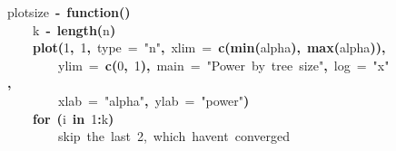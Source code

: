 \documentclass{elsarticle}
\makeatletter
\newcommand{\hlnumber}[1]{\textcolor[rgb]{0,0,0}{#1}}%
\newcommand{\hlfunctioncall}[1]{\textcolor[rgb]{.5,0,.33}{\textbf{#1}}}%
\newcommand{\hlstring}[1]{\textcolor[rgb]{.6,.6,1}{#1}}%
\newcommand{\hlkeyword}[1]{\textbf{#1}}%
\newcommand{\hlargument}[1]{\textcolor[rgb]{.69,.25,.02}{#1}}%
\newcommand{\hlcomment}[1]{\textcolor[rgb]{.18,.6,.34}{#1}}%
\newcommand{\hlassignement}[1]{\textbf{#1}}%
\newcommand{\hlsymbol}[1]{#1}%
\newcommand{\hlstd}[1]{\textcolor[rgb]{0,0,0}{#1}}%
\newenvironment{kframe}{%
 \def\FrameCommand##1{\hskip\@totalleftmargin \hskip-\fboxsep
 \colorbox{shadecolor}{##1}\hskip-\fboxsep
     \hskip-\linewidth \hskip-\@totalleftmargin \hskip\columnwidth}%
 \MakeFramed {\advance\hsize-\width
   \@totalleftmargin\z@ \linewidth\hsize
   \@setminipage}}%
 {\par\unskip\endMakeFramed}
\newenvironment{knitrout}{}{} %
\makeatother
\begin{document}
\begin{figure}
\begin{center}
\begin{knitrout}
\color{fgcolor}\begin{kframe}
\begin{flushleft}
\ttfamily\noindent
\hlsymbol{plot\usebox{\hlnormalsizeboxunderscore}size}{\ }\hlassignement{\usebox{\hlnormalsizeboxlessthan}-}{\ }\hlkeyword{function}\hlkeyword{(}\hlkeyword{)}{\ }\hlkeyword{\usebox{\hlnormalsizeboxopenbrace}}\hspace*{\fill}\\
\hlstd{}{\ }{\ }{\ }{\ }\hlsymbol{k}{\ }\hlassignement{\usebox{\hlnormalsizeboxlessthan}-}{\ }\hlfunctioncall{length}\hlkeyword{(}\hlsymbol{n}\hlkeyword{)}\hspace*{\fill}\\
\hlstd{}{\ }{\ }{\ }{\ }\hlfunctioncall{plot}\hlkeyword{(}\hlnumber{1}\hlkeyword{,}{\ }\hlnumber{1}\hlkeyword{,}{\ }\hlargument{type}{\ }\hlargument{=}{\ }\hlstring{"{}n"{}}\hlkeyword{,}{\ }\hlargument{xlim}{\ }\hlargument{=}{\ }\hlfunctioncall{c}\hlkeyword{(}\hlfunctioncall{min}\hlkeyword{(}\hlsymbol{alpha}\hlkeyword{)}\hlkeyword{,}{\ }\hlfunctioncall{max}\hlkeyword{(}\hlsymbol{alpha}\hlkeyword{)}\hlkeyword{)}\hlkeyword{,}\hspace*{\fill}\\
\hlstd{}{\ }{\ }{\ }{\ }{\ }{\ }{\ }{\ }\hlargument{ylim}{\ }\hlargument{=}{\ }\hlfunctioncall{c}\hlkeyword{(}\hlnumber{0}\hlkeyword{,}{\ }\hlnumber{1}\hlkeyword{)}\hlkeyword{,}{\ }\hlargument{main}{\ }\hlargument{=}{\ }\hlstring{"{}Power{\ }by{\ }tree{\ }size"{}}\hlkeyword{,}{\ }\hlargument{log}{\ }\hlargument{=}{\ }\hlstring{"{}x"{}}\hlkeyword{,}\hspace*{\fill}\\
\hlstd{}{\ }{\ }{\ }{\ }{\ }{\ }{\ }{\ }\hlargument{xlab}{\ }\hlargument{=}{\ }\hlstring{"{}alpha"{}}\hlkeyword{,}{\ }\hlargument{ylab}{\ }\hlargument{=}{\ }\hlstring{"{}power"{}}\hlkeyword{)}\hspace*{\fill}\\
\hlstd{}{\ }{\ }{\ }{\ }\hlkeyword{for}{\ }\hlkeyword{(}\hlsymbol{i}{\ }\hlkeyword{in}{\ }\hlnumber{1}\hlkeyword{:}\hlsymbol{k}\hlkeyword{)}{\ }\hlkeyword{\usebox{\hlnormalsizeboxopenbrace}}\hspace*{\fill}\\
\hlstd{}{\ }{\ }{\ }{\ }{\ }{\ }{\ }{\ }\hlcomment{\usebox{\hlnormalsizeboxhash}\usebox{\hlnormalsizeboxhash}{\ }skip{\ }the{\ }last{\ }2,{\ }which{\ }haven\usebox{\hlnormalsizeboxsinglequote}t{\ }converged}\hspace*{\fill}\\

\end{flushleft}
\end{kframe}
\end{knitrout}
\end{center}
\end{figure}
\end{document}
